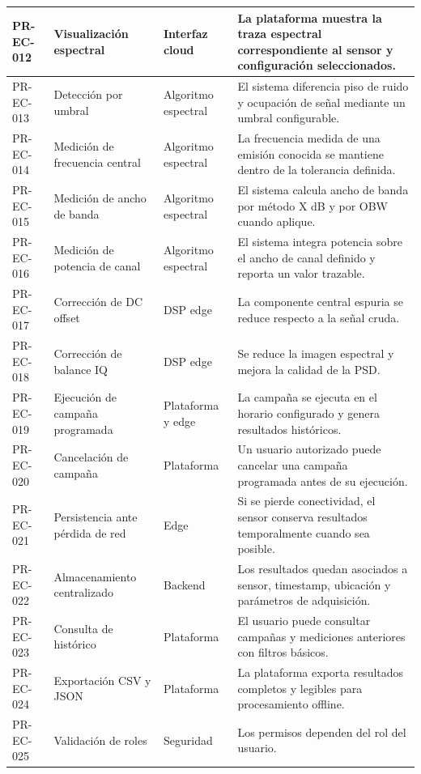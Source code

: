 \begin{longtable}{|>{\raggedright\arraybackslash}p{1.6cm}|>{\raggedright\arraybackslash}p{3.2cm}|>{\raggedright\arraybackslash}p{3.2cm}|>{\raggedright\arraybackslash}p{5.0cm}|}
\hline
PR-EC-012 & Visualización espectral & Interfaz cloud & La plataforma muestra la traza espectral correspondiente al sensor y configuración seleccionados. \\
\hline
PR-EC-013 & Detección por umbral & Algoritmo espectral & El sistema diferencia piso de ruido y ocupación de señal mediante un umbral configurable. \\
\hline
PR-EC-014 & Medición de frecuencia central & Algoritmo espectral & La frecuencia medida de una emisión conocida se mantiene dentro de la tolerancia definida. \\
\hline
PR-EC-015 & Medición de ancho de banda & Algoritmo espectral & El sistema calcula ancho de banda por método X dB y por OBW cuando aplique. \\
\hline
PR-EC-016 & Medición de potencia de canal & Algoritmo espectral & El sistema integra potencia sobre el ancho de canal definido y reporta un valor trazable. \\
\hline
PR-EC-017 & Corrección de DC offset & DSP edge & La componente central espuria se reduce respecto a la señal cruda. \\
\hline
PR-EC-018 & Corrección de balance IQ & DSP edge & Se reduce la imagen espectral y mejora la calidad de la PSD. \\
\hline
PR-EC-019 & Ejecución de campaña programada & Plataforma y edge & La campaña se ejecuta en el horario configurado y genera resultados históricos. \\
\hline
PR-EC-020 & Cancelación de campaña & Plataforma & Un usuario autorizado puede cancelar una campaña programada antes de su ejecución. \\
\hline
PR-EC-021 & Persistencia ante pérdida de red & Edge & Si se pierde conectividad, el sensor conserva resultados temporalmente cuando sea posible. \\
\hline
PR-EC-022 & Almacenamiento centralizado & Backend & Los resultados quedan asociados a sensor, timestamp, ubicación y parámetros de adquisición. \\
\hline
PR-EC-023 & Consulta de histórico & Plataforma & El usuario puede consultar campañas y mediciones anteriores con filtros básicos. \\
\hline
PR-EC-024 & Exportación CSV y JSON & Plataforma & La plataforma exporta resultados completos y legibles para procesamiento offline. \\
\hline
PR-EC-025 & Validación de roles & Seguridad & Los permisos dependen del rol del usuario. \\
\hline

\end{longtable}
